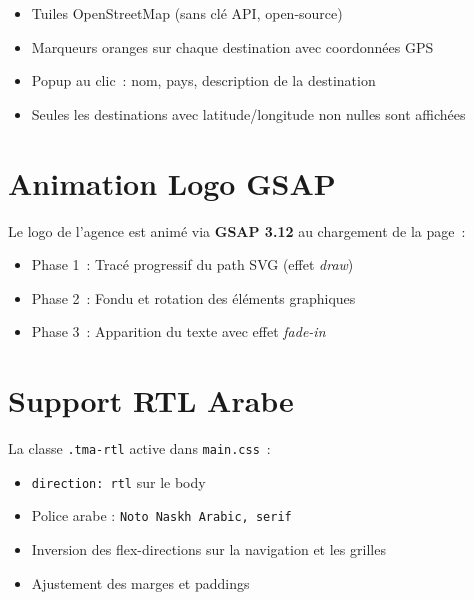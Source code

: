 \documentclass[12pt,a4paper]{report}
\begin{document}
\begin{itemize}
  \item Tuiles OpenStreetMap (sans cl\'e API, open-source)
  \item Marqueurs oranges sur chaque destination avec coordonn\'ees GPS
  \item Popup au clic~: nom, pays, description de la destination
  \item Seules les destinations avec latitude/longitude non nulles sont affich\'ees
\end{itemize}

\section{Animation Logo GSAP}

Le logo de l'agence est anim\'e via \textbf{GSAP 3.12} au chargement de la page~:

\begin{itemize}
  \item Phase 1~: Trac\'e progressif du path SVG (effet \textit{draw})
  \item Phase 2~: Fondu et rotation des \'el\'ements graphiques
  \item Phase 3~: Apparition du texte avec effet \textit{fade-in}
\end{itemize}

\section{Support RTL Arabe}


La classe \texttt{.tma-rtl} active dans \texttt{main.css}~:
\begin{itemize}
  \item \texttt{direction: rtl} sur le body
  \item Police arabe : \texttt{Noto Naskh Arabic, serif}
  \item Inversion des flex-directions sur la navigation et les grilles
  \item Ajustement des marges et paddings
\end{itemize}
\end{document}
